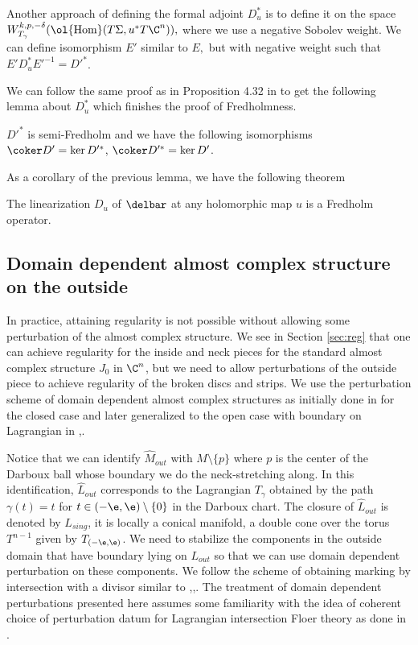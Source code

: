 \begin{remark}
 Another approach of defining the formal adjoint $D_u^* $ is to define it on the space $W^{k,p,-\delta}_{T_\gamma} ( \ol{\operatorname{Hom}}(T\Sigma,u^*T\C^n)),$  where we use a negative Sobolev weight. We can define isomorphism $E'$ similar to $E,$ but with negative weight such that $E'D_u^* E'^{-1} = D'^*$.
\end{remark}

\noindent We can follow the same proof as in Proposition 4.32 in \cite{wendlSFT} to get the following lemma about $D_u^*$ which finishes the proof of Fredholmness.

\begin{lemma}
$D'^*$ is semi-Fredholm and we have the following isomorphisms $\coker D' = \ker D'^*$, $\coker D'^* = \ker D' $.
\end{lemma}

\noindent As a corollary of the previous lemma, we have the following theorem

\begin{Theorem} \label{thm:fred}
The linearization $D_u$ of $\delbar$ at any holomorphic map $u$ is a Fredholm operator.
\end{Theorem}


\subsection{Domain dependent almost complex structure on the outside}\label{subsec:domdepacs}

In practice, attaining regularity is not possible without allowing some perturbation of the almost complex structure. We see in Section \ref{sec:reg} that one can achieve regularity for the inside and neck pieces for the standard almost complex structure $J_0$ in $\C^n$, but we need to allow perturbations of the outside piece to achieve regularity of the broken discs and strips. We use the perturbation scheme of domain dependent almost complex structures as initially done in \cite{CMtrans} for the closed case and later generalized to the open case with boundary on Lagrangian in \cite{charwoodstabil},\cite{floerflip}.

\noindent Notice that we can identify $ \widehat M_{out}$ with $M\setminus \{ p \}$ where $p$ is the center of the Darboux ball whose boundary we do the neck-stretching along. In this identification, $\widehat L_{out}$ corresponds to the Lagrangian $T_\gamma$ obtained by the path $\gamma(t) = t$ for $t\in (-\e,\e) \setminus \{ 0 \}$ in the Darboux chart. The closure of $\widehat L_{out}$ is denoted by $L_{sing}$, it is locally a conical manifold, a double cone over the torus $T^{n-1}$ given by $T_{(-\e,\e)}$. We need to stabilize the components in the outside domain that have boundary lying on $L_{out}$ so that we can use domain dependent perturbation on these components. We follow the scheme of obtaining marking by intersection with a divisor similar to \cite{CMtrans}  ,\cite{charwoodstabil},\cite{floerflip}. The treatment of domain dependent perturbations presented here assumes some familiarity with the idea of coherent choice of perturbation datum for Lagrangian intersection Floer theory as done in \cite{charwoodstabil}.

